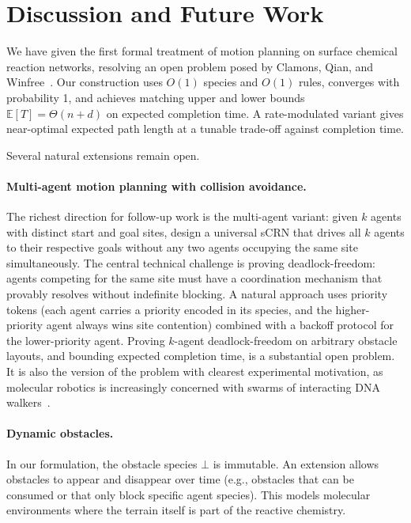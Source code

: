 \documentclass[11pt]{article}
\theoremstyle{plain}
\theoremstyle{definition}
\theoremstyle{remark}
\begin{document}
\section{Discussion and Future Work}
\label{sec:discussion}

We have given the first formal treatment of motion planning on surface chemical reaction networks, resolving an open problem posed by Clamons, Qian, and Winfree~\cite{clamons2020}. Our construction uses $O(1)$ species and $O(1)$ rules, converges with probability 1, and achieves matching upper and lower bounds $\mathbb{E}[T] = \Theta(n + d)$ on expected completion time. A rate-modulated variant gives near-optimal expected path length at a tunable trade-off against completion time.

Several natural extensions remain open.

\paragraph{Multi-agent motion planning with collision avoidance.} The richest direction for follow-up work is the multi-agent variant: given $k$ agents with distinct start and goal sites, design a universal sCRN that drives all $k$ agents to their respective goals without any two agents occupying the same site simultaneously. The central technical challenge is proving deadlock-freedom: agents competing for the same site must have a coordination mechanism that provably resolves without indefinite blocking. A natural approach uses priority tokens (each agent carries a priority encoded in its species, and the higher-priority agent always wins site contention) combined with a backoff protocol for the lower-priority agent. Proving $k$-agent deadlock-freedom on arbitrary obstacle layouts, and bounding expected completion time, is a substantial open problem. It is also the version of the problem with clearest experimental motivation, as molecular robotics is increasingly concerned with swarms of interacting DNA walkers~\cite{thubagere2017,sarraf2023}.

\paragraph{Dynamic obstacles.} In our formulation, the obstacle species $\bot$ is immutable. An extension allows obstacles to appear and disappear over time (e.g., obstacles that can be consumed or that only block specific agent species). This models molecular environments where the terrain itself is part of the reactive chemistry.
\end{document}
